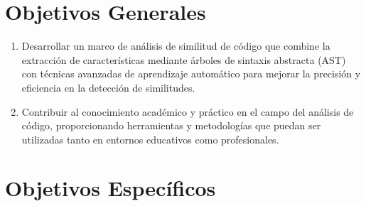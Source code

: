 \section*{Objetivos Generales} 

\renewcommand{\labelenumi}{\Roman{enumi}.}
\begin{enumerate}
	\item Desarrollar un marco de análisis de similitud de código que combine la extracción de características mediante árboles de sintaxis abstracta (AST) con técnicas avanzadas de aprendizaje automático para mejorar la precisión y eficiencia en la detección de similitudes.
	\item Contribuir al conocimiento académico y práctico en el campo del análisis de código, proporcionando herramientas y metodologías que puedan ser utilizadas tanto en entornos educativos como profesionales.
\end{enumerate}
 
\section*{Objetivos Específicos}

